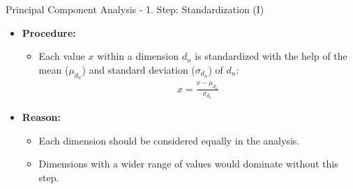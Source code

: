 \begin{frame}{Principal Component Analysis - 1. Step: Standardization (I)}
	\begin{itemize}
		\item \textbf{Procedure:}
		\begin{itemize}
			\item Each value $x$ within a dimension $d_n$ is standardized with 
			the help of the mean ($\mu_{d_n}$) and standard deviation 
			($\sigma_{d_n}$) of $d_n$:
			\begin{align}
				x = \frac{x - \mu_{d_n}}{\sigma_{d_n}}
			\end{align}
		\end{itemize}
		\item \textbf{Reason:}
		\begin{itemize}
			\item Each dimension should be considered equally in the analysis.
			\item Dimensions with a wider range of	values would dominate  
			without this step.
		\end{itemize}
	\end{itemize}
\end{frame}


